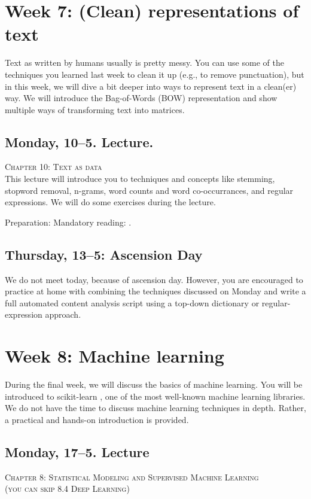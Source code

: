 \section*{Week 7: (Clean) representations of text}

Text as written by humans usually is pretty messy. You can use some of the techniques you learned last week to clean it up (e.g., to remove punctuation), but in this week, we will dive a bit deeper into ways to represent text in a clean(er) way. We will introduce the Bag-of-Words (BOW) representation and show multiple ways of transforming text into matrices.

\subsection*{Monday, 10--5. Lecture.}
\textsc{ Chapter 10: Text as data}\\
This lecture will introduce you to techniques and concepts like stemming, stopword removal, n-grams, word counts and word co-occurrances, and regular expressions. We will do some exercises during the lecture.

Preparation: Mandatory reading: \cite{Boumans2016}.

\subsection*{Thursday, 13--5: Ascension Day}
We do not meet today, because of ascension day. However, you are encouraged to practice at home with combining the techniques discussed on Monday and write a full automated content analysis script using a top-down dictionary or regular-expression approach.

\section*{Week 8: Machine learning}
During the final week, we will discuss the basics of machine learning. You will be introduced to scikit-learn \citep{scikit-learn}, one of the most well-known machine learning libraries. We do not have the time to discuss machine learning techniques in depth. Rather, a practical and hands-on introduction is provided. 

\subsection*{Monday, 17--5. Lecture}
\textsc{ Chapter 8: Statistical Modeling and Supervised Machine Learning}\\
\textsc{ (you can skip 8.4 Deep Learning)}\\

